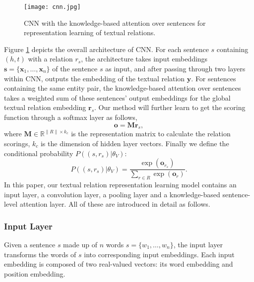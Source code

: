 \documentclass[11pt,a4paper]{article}
\begin{document}


\begin{figure}[]
\centering
\texttt{[image: cnn.jpg]}
\caption{CNN with the knowledge-based attention over sentences for representation learning of textual relations.}
\label{fig:cnn}
\end{figure}



Figure \ref{fig:cnn} depicts the overall architecture of CNN. For each sentence $s$ containing $(h, t)$ with a relation $r_s$, the architecture takes input embeddings $\mathbf{s} = \{\mathbf{x}_1, \ldots, \mathbf{x}_n \}$ of the sentence $s$ as input, and after passing through two layers within CNN, outputs the embedding of the textual relation $\mathbf{y}$. For sentences containing the same entity pair, the knowledge-based attention over sentences takes a weighted sum of these sentences' output embeddings for the global textual relation embedding $\mathbf{r}_s$. Our method will further learn to get the scoring function through a softmax layer as follows,
\begin{equation}
\mathbf{o} = \mathbf{M}\mathbf{r}_s,
\label{eq:cnn_distance}
\end{equation}
where $\mathbf{M} \in \mathbb{R}^{\|R\| \times k_c} $ is the representation matrix to calculate the relation scorings, $k_c$ is the dimension of hidden layer vectors. Finally we define the conditional probability $P((s, r_s)|{\theta_V})$:
\begin{equation}
P((s, r_s)|{\theta_V}) = \frac{\exp(\mathbf{o}_{r_s})}{\sum_{r \in R} \exp(\mathbf{o}_{r})}.
\label{eq:cnn_distance1}
\end{equation}
In this paper, our textual relation representation learning model contains an input layer, a convolution layer, a pooling layer and a knowledge-based sentence-level attention layer. All of these are introduced in detail as follows.

\subsubsection{Input Layer}
Given a sentence $s$ made up of $n$ words $s = \{ w_1, \ldots , w_n\}$, the input layer transforms the words of $s$ into corresponding input embeddings. Each input embedding is composed of two real-valued vectors: its word embedding and position embedding.
\end{document}

